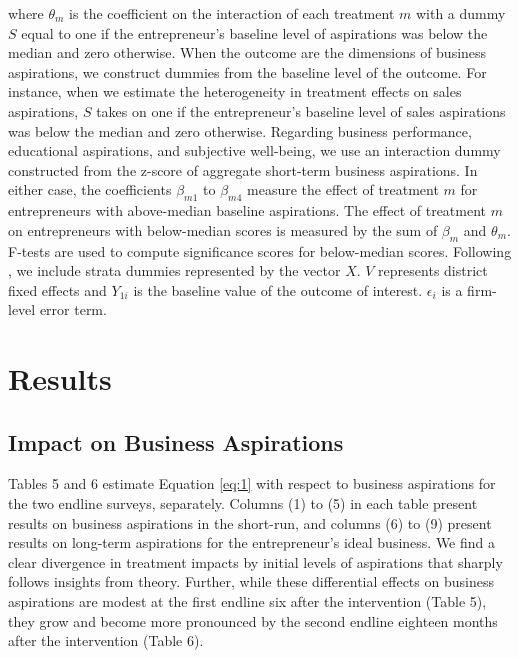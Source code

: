 \documentclass[11.5pt]{article}
\begin{document}
where $\theta_m$ is the coefficient on the interaction of each treatment $m$ with a dummy $S$ equal to one if the entrepreneur's baseline level of aspirations was below the median and zero otherwise. When the outcome are the dimensions of business aspirations, we construct dummies from the baseline level of the outcome. For instance, when we estimate the heterogeneity in treatment effects on sales aspirations, $S$ takes on one if the entrepreneur's baseline level of sales aspirations was below the median and zero otherwise. Regarding business performance, educational aspirations, and subjective well-being, we use an interaction dummy constructed from the z-score of aggregate short-term business aspirations. In either case, the coefficients $\beta_{m1}$ to $\beta_{m4}$ measure the effect of treatment $m$ for entrepreneurs with above-median baseline aspirations. The effect of treatment $m$ on entrepreneurs with below-median scores is measured by the sum of $\beta_m$ and $\theta_m$. %
F-tests are used to compute significance scores for below-median scores. Following \citet{Bruhn2009}, we include strata dummies represented by the vector $X$. $V$ represents district fixed effects and $Y_{1i}$ is the baseline value of the outcome of interest. $\epsilon_i$ is a firm-level error term.


\section{Results}\label{sec.analysis}

\subsection{Impact on Business Aspirations}

Tables 5 and 6 estimate Equation \ref{eq:1} with respect to business aspirations for the two endline surveys, separately. Columns (1) to (5) in each table present results on business aspirations in the short-run, and columns (6) to (9) present results on long-term aspirations for the entrepreneur's ideal business. We find a clear divergence in treatment impacts by initial levels of aspirations that sharply follows insights from theory. Further, while these differential effects on business aspirations are modest at the first endline six after the intervention (Table 5), they grow and become more pronounced by the second endline eighteen months after the intervention (Table 6).
\end{document}
